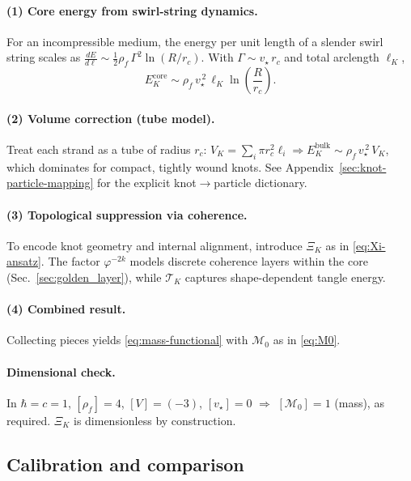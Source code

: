 \documentclass[smallextended]{svjour3}       %
\providecommand{\rc}{r_c}
\newcommand{\rhoF}{\rho_{\!f}}      %
\newcommand{\vstar}{v_\star}                           %
\begin{document}
	\paragraph{(1) Core energy from swirl-string dynamics.}
	For an incompressible medium, the energy per unit length of a slender swirl string scales as
	\(
	\tfrac{dE}{d\ell} \sim \tfrac{1}{2}\rhoF\,\Gamma^2 \ln (R/\rc)
	\).
	With \(\Gamma \sim \vstar\,\rc\) and total arclength \(\ell_K\),
	\begin{equation}
		E_K^{\mathrm{core}} \sim \rhoF\,\vstar^{\,2}\,\ell_K \ln\!\left(\frac{R}{\rc}\right).
	\end{equation}

	\paragraph{(2) Volume correction (tube model).}
	Treat each strand as a tube of radius \(\rc\):
	\(
	V_K=\sum_i \pi \rc^2 \ell_i
	\Rightarrow
	E_K^{\mathrm{bulk}} \sim \rhoF\,\vstar^{\,2}\,V_K
	\),
	which dominates for compact, tightly wound knots.
	See Appendix~\ref{sec:knot-particle-mapping} for the explicit knot\(\to\)particle dictionary.

	\paragraph{(3) Topological suppression via coherence.}
	To encode knot geometry and internal alignment, introduce \(\Xi_K\) as in \eqref{eq:Xi-ansatz}. The factor \(\varphi^{-2k}\) models discrete coherence layers within the core (Sec.~\ref{sec:golden_layer}), while \(\mathcal{T}_K\) captures shape-dependent tangle energy.

	\paragraph{(4) Combined result.}
	Collecting pieces yields \eqref{eq:mass-functional} with \(\mathcal{M}_0\) as in \eqref{eq:M0}.

	\paragraph{Dimensional check.}
	In \(\hbar=c=1\), \([\rhoF]=4\), \([V]=(-3)\), \([\vstar]=0\) \(\Rightarrow\) \([\mathcal{M}_0]=1\) (mass), as required. \(\Xi_K\) is dimensionless by construction.

	\subsection{Calibration and comparison}
\end{document}
